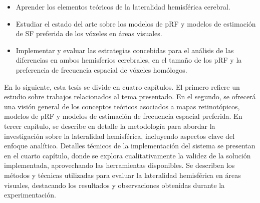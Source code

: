 \begin{itemize}
	\item Aprender los elementos te\'oricos de la lateralidad hemisf\'erica cerebral.
	
	\item Estudiar el estado del arte sobre los modelos de pRF y modelos de estimaci\'on de SF preferida de los v\'oxeles en \'areas visuales.
	
	\item Implementar y evaluar las estrategias concebidas para el an\'alisis de las diferencias en ambos hemisferios cerebrales, en el tama\~no de los pRF y la preferencia de frecuencia espacial de v\'oxeles hom\'ologos.
	
\end{itemize}
En lo siguiente, esta tesis se divide en cuatro capítulos. El primero refiere un estudio sobre trabajos relacionados al tema presentado. En el segundo, se ofrecerá una visión general de los conceptos teóricos asociados a mapas retinot\'opicos, modelos de pRF y modelos de estimaci\'on de frecuencia espacial preferida. En tercer cap\'itulo, se describe en detalle la metodología para abordar la investigación sobre la lateralidad hemisférica, incluyendo aspectos clave del enfoque analítico. Detalles técnicos de la implementación del sistema se presentan en el cuarto cap\'itulo, donde se explora cualitativamente la validez de la solución implementada, aprovechando las herramientas disponibles. Se describen los métodos y técnicas utilizadas para evaluar la lateralidad hemisférica en áreas visuales, destacando los resultados y observaciones obtenidas durante la experimentación.
 
	




